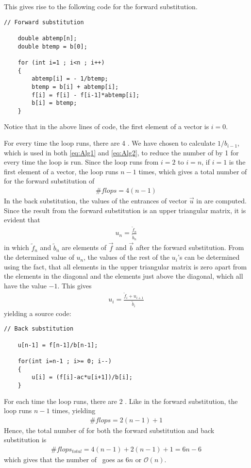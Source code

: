 This gives rise to the following code for the forward substitution.

\begin{lstlisting}
// Forward substitution

    double abtemp[n];
    double btemp = b[0];

    for (int i=1 ; i<n ; i++)
    {
        abtemp[i] = - 1/btemp;
        btemp = b[i] + abtemp[i];
        f[i] = f[i] - f[i-1]*abtemp[i];
        b[i] = btemp;
    }
\end{lstlisting}
Notice that in the above lines of code, the first element of a vector is $i=0$.

For every time the loop runs, there are 4 \flops . We have chosen to calculate $1/b_{i-1}$, which is used in both \eqref{eq:Alg1} and \eqref{eq:Alg2}, to reduce the number of \flops by 1 for every time the loop is run. 
Since the loop runs from $i=2$ to $i=n$, if $i=1$ is the first element of a vector, the loop runs $n-1$ times, which gives a total number of \flops for the forward substitution of
\begin{align}
	 \# flops = 4(n-1)
	 \label{eq:Alg3}
\end{align} 
In the back substitution, the values of the entrances of vector $\vec{u}$ in  are computed. 
Since the result from the forward substitution is an upper triangular matrix, it is evident that
\begin{align}
	u_n = \frac{\tilde{f}_n}{\tilde{b}_n}  
	\label{eq:Alg4}
\end{align}
in which $\tilde{f}_n$ and $\tilde{b}_n$ are elements of $\vec{f}$ and $\vec{b}$ after the forward substitution. 
From the determined value of $u_n$, the values of the rest of the $u_i$'s can be determined using the fact, that all elements in the upper triangular matrix is zero apart from the elements in the diagonal and the elements just above the diagonal, which all have the value $-1$. 
This gives
\begin{align}
	u_i = \frac{\tilde{f}_i + u_{i+1}}{\tilde{b}_i} 
	\label{eq:Alg5}
\end{align}
yielding a source code:
\begin{lstlisting}
// Back substitution

    u[n-1] = f[n-1]/b[n-1];

    for(int i=n-1 ; i>= 0; i--)
    {
        u[i] = (f[i]-ac*u[i+1])/b[i];
    }
\end{lstlisting} 
For each time the loop runs, there are $2$ \flops . Like in the forward substitution, the loop runs $n-1$ times, yielding
\begin{align}
	 \# flops = 2(n-1)+1
	 \label{eq:Alg6}
\end{align} 
Hence, the total number of \flops for both the forward substitution and back substitution is
\begin{align}
	 \# flops_{total} = 4(n-1)+2(n-1)+1 = 6n-6 
	 \label{eq:Alg7}
\end{align}  
which gives that the number of \flops \, goes as $6n$ or $\mathcal{O}(n)$.





